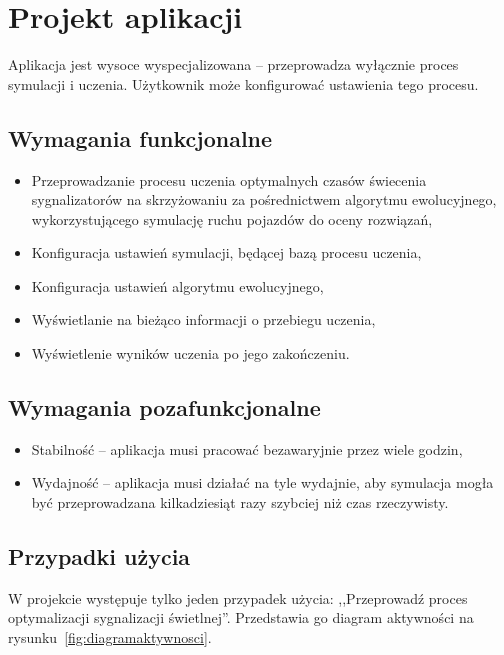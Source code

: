 \chapter*{Projekt aplikacji}
Aplikacja jest wysoce wyspecjalizowana -- przeprowadza wyłącznie proces symulacji i uczenia. Użytkownik może konfigurować ustawienia tego procesu.
\section*{Wymagania funkcjonalne}
\begin{itemize}
	\item Przeprowadzanie procesu uczenia optymalnych czasów świecenia sygnalizatorów na skrzyżowaniu za pośrednictwem algorytmu ewolucyjnego, wykorzystującego symulację ruchu pojazdów do oceny rozwiązań, 
	\item Konfiguracja ustawień symulacji, będącej bazą procesu uczenia,
	\item Konfiguracja ustawień algorytmu ewolucyjnego,
	\item Wyświetlanie na bieżąco informacji o przebiegu uczenia,
	\item Wyświetlenie wyników uczenia po jego zakończeniu.
\end{itemize}
\section*{Wymagania pozafunkcjonalne}
\begin{itemize}
	\item Stabilność -- aplikacja musi pracować bezawaryjnie przez wiele godzin,
	\item Wydajność -- aplikacja musi działać na tyle wydajnie, aby symulacja mogła być przeprowadzana kilkadziesiąt razy szybciej niż czas rzeczywisty.
\end{itemize}
\section*{Przypadki użycia}
W projekcie występuje tylko jeden przypadek użycia: ,,Przeprowadź proces optymalizacji sygnalizacji świetlnej''. Przedstawia go diagram aktywności na rysunku~\ref{fig:diagramaktywnosci}. 

